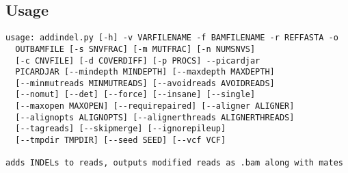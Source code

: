 \documentclass[letterpaper,11pt]{article}
\begin{document}
\subsection{Usage}
\begin{verbatim}
usage: addindel.py [-h] -v VARFILENAME -f BAMFILENAME -r REFFASTA -o
  OUTBAMFILE [-s SNVFRAC] [-m MUTFRAC] [-n NUMSNVS]
  [-c CNVFILE] [-d COVERDIFF] [-p PROCS] --picardjar
  PICARDJAR [--mindepth MINDEPTH] [--maxdepth MAXDEPTH]
  [--minmutreads MINMUTREADS] [--avoidreads AVOIDREADS]
  [--nomut] [--det] [--force] [--insane] [--single]
  [--maxopen MAXOPEN] [--requirepaired] [--aligner ALIGNER]
  [--alignopts ALIGNOPTS] [--alignerthreads ALIGNERTHREADS]
  [--tagreads] [--skipmerge] [--ignorepileup]
  [--tmpdir TMPDIR] [--seed SEED] [--vcf VCF]

adds INDELs to reads, outputs modified reads as .bam along with mates


\end{verbatim}
\end{document}
